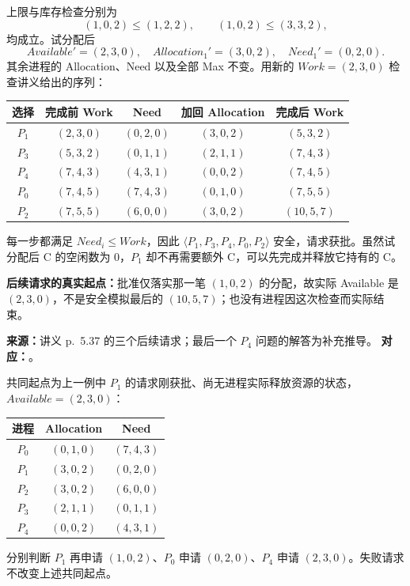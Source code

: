 \begin{checkedsolution}
上限与库存检查分别为
\[
  (1,0,2)\le(1,2,2),\qquad (1,0,2)\le(3,3,2),
\]
均成立。试分配后
\[
  Available'=(2,3,0),\quad Allocation_1'=(3,0,2),\quad Need_1'=(0,2,0).
\]
其余进程的 Allocation、Need 以及全部 Max 不变。用新的 $Work=(2,3,0)$ 检查讲义给出的序列：
\begin{center}
\begin{tabular}{@{}ccccc@{}}
  \toprule
  选择 & 完成前 Work & Need & 加回 Allocation & 完成后 Work \\
  \midrule
  $P_1$ & $(2,3,0)$ & $(0,2,0)$ & $(3,0,2)$ & $(5,3,2)$ \\
  $P_3$ & $(5,3,2)$ & $(0,1,1)$ & $(2,1,1)$ & $(7,4,3)$ \\
  $P_4$ & $(7,4,3)$ & $(4,3,1)$ & $(0,0,2)$ & $(7,4,5)$ \\
  $P_0$ & $(7,4,5)$ & $(7,4,3)$ & $(0,1,0)$ & $(7,5,5)$ \\
  $P_2$ & $(7,5,5)$ & $(6,0,0)$ & $(3,0,2)$ & $(10,5,7)$ \\
  \bottomrule
\end{tabular}
\end{center}
每一步都满足 $Need_i\le Work$，因此 $\langle P_1,P_3,P_4,P_0,P_2\rangle$ 安全，请求获批。虽然试分配后 C 的空闲数为 $0$，$P_1$ 却不再需要额外 C，可以先完成并释放它持有的 C。

\textbf{后续请求的真实起点：}批准仅落实那一笔 $(1,0,2)$ 的分配，故实际 Available 是 $(2,3,0)$，不是安全模拟最后的 $(10,5,7)$；也没有进程因这次检查而实际结束。
\end{checkedsolution}

\par\noindent\begin{minipage}{\textwidth}

\textbf{来源：}讲义 p.~5.37 的三个后续请求；最后一个 $P_4$ 问题的解答为补充推导。\quad
\textbf{对应：}。

共同起点为上一例中 $P_1$ 的请求刚获批、尚无进程实际释放资源的状态，$Available=(2,3,0)$：
\end{minipage}\par
\begin{center}
\begin{tabular}{@{}ccc@{}}
  \toprule
  进程 & Allocation & Need \\
  \midrule
  $P_0$ & $(0,1,0)$ & $(7,4,3)$ \\
  $P_1$ & $(3,0,2)$ & $(0,2,0)$ \\
  $P_2$ & $(3,0,2)$ & $(6,0,0)$ \\
  $P_3$ & $(2,1,1)$ & $(0,1,1)$ \\
  $P_4$ & $(0,0,2)$ & $(4,3,1)$ \\
  \bottomrule
\end{tabular}
\end{center}
分别判断 $P_1$ 再申请 $(1,0,2)$、$P_0$ 申请 $(0,2,0)$、$P_4$ 申请 $(2,3,0)$。失败请求不改变上述共同起点。

